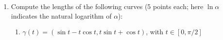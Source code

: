 \documentclass[fleqn]{article}
\begin{document}
\begin{enumerate}
      \textcolor{hwColor}{
        Let's assume $\overrightarrow{A}=<a_x, a_y, a_z>$ and $\overrightarrow{r}=<r_x, r_y, r_z>$. \\
        $
          \overrightarrow{\nabla} \times (\overrightarrow{A} \times \overrightarrow{r})
          =\left[\dfrac{\partial}{\partial x}\mathbf{\hat{i}}+\dfrac{\partial}{\partial y}\mathbf{\hat{j}}+\dfrac{\partial}{\partial z}\mathbf{\hat{k}}\right] \times  \begin{vmatrix}
            \mathbf{\hat{i}} & \mathbf{\hat{j}} & \mathbf{\hat{k}} \\
            a_x & a_y & a_z \\
            r_x & r_y & r_z
          \end{vmatrix} \\
          \\
          =\begin{vmatrix}
            \mathbf{\hat{i}} & \mathbf{\hat{j}} & \mathbf{\hat{k}} \\
            \dfrac{\partial}{\partial x} & \dfrac{\partial}{\partial y} & \dfrac{\partial}{\partial z} \\
            a_y r_z-a_z r_y & a_x r_z- a_z r_x & a_xr_y-a_yr_x
          \end{vmatrix} \\
          \\
          =\mathbf{\hat{i}}(\dfrac{\partial}{\partial y}(a_xr_y-a_yr_x)-\dfrac{\partial}{\partial z}(a_x r_z- a_z r_x))
          -\mathbf{\hat{j}}(\dfrac{\partial}{\partial x}(a_xr_y-a_yr_x)-\dfrac{\partial}{\partial z}(a_y r_z-a_z r_y))
          +\mathbf{\hat{k}}(\dfrac{\partial}{\partial x}(a_x r_z- a_z r_x)-\dfrac{\partial}{\partial y}(a_y r_z-a_z r_y)) \\
          \\
          =\mathbf{\hat{i}}(2a_x)+\mathbf{\hat{j}}(2a_y)+\mathbf{\hat{k}}(2a_z)=2\left(\mathbf{\hat{i}}(a_x)+\mathbf{\hat{j}}(a_y)+\mathbf{\hat{k}}(a_z)\right) \\
          \\
          \therefore ~ \overrightarrow{\nabla} \times (\overrightarrow{A} \times \overrightarrow{r})=2\overrightarrow{A}
        $
      }
    
    \item Compute the lengths of the following curves (5 points each; here $\ln \alpha$ indicates the natural logarithm of $\alpha$): 
    
      \begin{enumerate}
      \item $\gamma(t)=(\sin t-t\cos t,t\sin t+\cos t)$,  with $t\in [0,\pi/2]$ 
      

\end{enumerate}
\end{enumerate}
\end{document}
